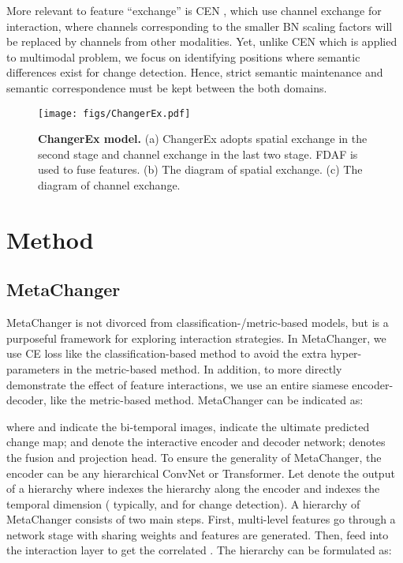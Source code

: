 \documentclass[10pt,twocolumn,letterpaper]{article}
\begin{document}
More relevant to feature “exchange” is CEN \cite{wang2020deep}, which use channel exchange for interaction, where channels corresponding to the smaller BN scaling factors will be replaced by channels from other modalities. Yet, unlike CEN which is applied to multimodal problem, we focus on identifying positions where semantic differences exist for change detection. Hence, strict semantic maintenance and semantic correspondence must be kept between the both domains.






\begin{figure*}[t]
  \centering
\texttt{[image: figs/ChangerEx.pdf]}
   \caption{\textbf{ChangerEx model.} (a) ChangerEx adopts spatial exchange in the second stage and channel exchange in the last two stage. FDAF is used to fuse features. (b) The diagram of spatial exchange. (c) The diagram of channel exchange.}
   \label{fig:ChangerEx}
\end{figure*}




\section{Method}
\subsection{MetaChanger}
\label{section:MetaChanger}

MetaChanger is not divorced from classification-/metric-based models, but is a purposeful framework for exploring interaction strategies. In MetaChanger, we use CE loss like the classification-based method to avoid the extra hyper-parameters in the metric-based method.  In addition, to more directly demonstrate the effect of feature interactions, we use an entire siamese encoder-decoder, like the metric-based method. MetaChanger can be indicated as:


where  and  indicate the bi-temporal images,  indicate the ultimate predicted change map;  and  denote the interactive encoder and decoder network;  denotes the fusion and projection head.
To ensure the generality of MetaChanger, the encoder can be any hierarchical ConvNet or Transformer. Let  denote the output of a hierarchy where  indexes the hierarchy along the encoder and  indexes the temporal dimension ( typically, and  for change detection). A hierarchy of MetaChanger consists of two main steps. First, multi-level features  go through a network stage with sharing weights and features  are generated. Then,  feed into the interaction layer to get the correlated . The hierarchy  can be formulated as:
\end{document}
